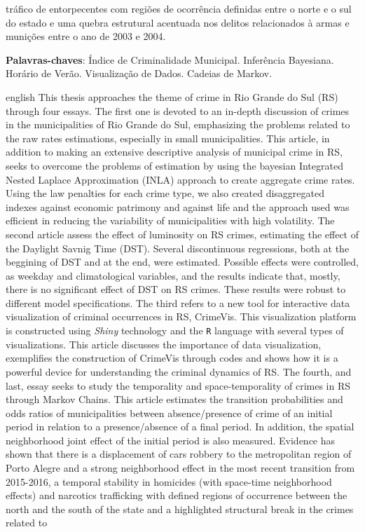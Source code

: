 \documentclass[12pt,openright,oneside,a4paper,english,french,spanish]{abntex2}
\numberwithin{table}{section} %
\numberwithin{figure}{section} %
\begin{document}
\begin{resumo}
tráfico de entorpecentes com regiões de ocorrência definidas entre o norte e o sul do estado e uma quebra estrutural acentuada nos delitos relacionados à armas e munições entre o ano de 2003 e 2004.

 \vspace{\onelineskip}
    
 \noindent
 \textbf{Palavras-chaves}: Índice de Criminalidade Municipal. Inferência Bayesiana. Horário de Verão. Visualização de Dados. Cadeias de Markov.
\end{resumo}

\begin{resumo}[Abstract]
 \begin{otherlanguage*}{english}
This thesis approaches the theme of crime in Rio Grande do Sul (RS) through four essays. The first one is devoted to an in-depth discussion of crimes in the municipalities of Rio Grande do Sul, emphasizing the problems related to the raw rates estimations, especially in small municipalities. This article, in addition to making an extensive descriptive analysis of municipal crime in RS, seeks to overcome the problems of estimation by using the bayesian Integrated Nested Laplace Approximation (INLA) approach to create aggregate crime rates. Using the law penalties for each crime type, we also created disaggregated indexes against economic patrimony and against life and the approach used was efficient in reducing the variability of municipalities with high volatility. The second article assess the effect of luminosity on RS crimes, estimating the effect of the Daylight Savnig Time (DST). Several discontinuous regressions, both at the beggining of DST and at the end, were estimated. Possible effects were controlled, as weekday and climatological variables, and the results indicate that, mostly, there is no significant effect of DST on RS crimes. These results were robust to different model specifications. The third refers to a new tool for interactive data visualization of criminal occurrences in RS, CrimeVis. This visualization platform is constructed using \textit{Shiny} technology and the \texttt{R} language with several types of visualizations. This article discusses the importance of data visualization, exemplifies the construction of CrimeVis through codes and shows how it is a powerful device for understanding the criminal dynamics of RS. The fourth, and last, essay seeks to study the temporality and space-temporality of crimes in RS through Markov Chains. This article estimates the transition probabilities and odds ratios of municipalities between absence/presence of crime of an initial period in relation to a presence/absence of a final period. In addition, the spatial neighborhood joint effect of the initial period is also measured. Evidence has shown that there is a displacement of cars robbery to the metropolitan region of Porto Alegre and a strong neighborhood effect in the most recent transition from 2015-2016, a temporal stability in homicides (with space-time neighborhood effects) and narcotics trafficking with defined regions of occurrence between the north and the south of the state and a highlighted structural break in the crimes related to 
\end{otherlanguage*}
\end{resumo}
\end{document}
